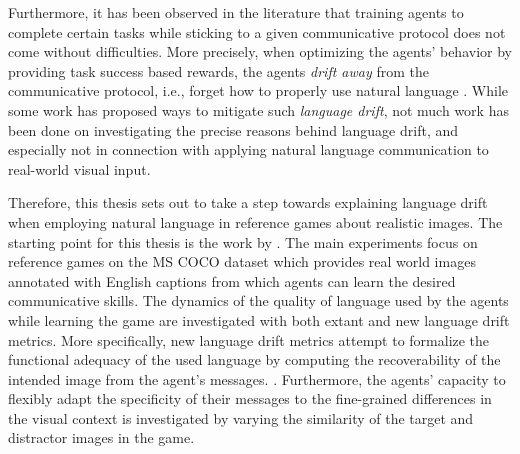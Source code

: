 Furthermore, it has been observed in the literature that training agents to complete certain tasks while sticking to a given communicative protocol does not come without difficulties. More precisely, when optimizing the agents' behavior by providing task success  based rewards, the agents \textit{drift away} from the communicative protocol, i.e., forget how to properly use natural language \parencite{lee2019countering, lazaridou2020multi, lu2020countering}.  While some work has proposed ways to mitigate such \textit{language drift}, not much work has been done on investigating the precise reasons behind language drift, and especially not in connection with applying natural language communication to real-world visual input. 

Therefore, this thesis sets out to take a step towards explaining language drift when employing natural language in reference games about realistic images. The starting point for this thesis is the work by \cite{lazaridou2020multi}. The main  experiments focus on reference games on the MS COCO dataset which provides real world images annotated with English captions from which agents can learn the desired communicative skills. The dynamics of the quality of language used by the agents while learning the game are investigated with both extant and new language drift metrics. More specifically, new language drift metrics attempt to formalize the functional adequacy of the used language by computing the recoverability of the intended image from the agent's messages. . Furthermore, the agents' capacity to flexibly adapt the specificity of their messages to the fine-grained differences in the visual context is investigated by varying the similarity of the target and distractor images in the game. %

